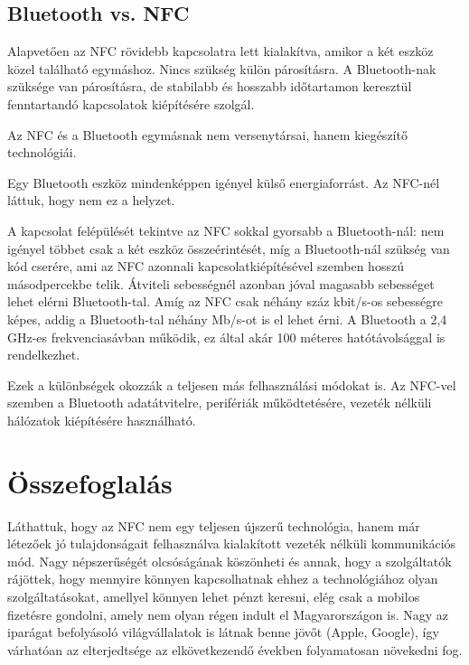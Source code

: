 \documentclass[12pt]{article}
\begin{document}
\subsection{Bluetooth vs. NFC}
Alapvetően az NFC rövidebb kapcsolatra lett kialakítva, amikor a két eszköz közel 
található egymáshoz. Nincs szükség külön párosításra. A Bluetooth-nak szüksége 
van párosításra, de stabilabb és hosszabb időtartamon keresztül fenntartandó
kapcsolatok kiépítésére szolgál.

Az NFC és a Bluetooth egymásnak nem versenytársai, hanem kiegészítő technológiái.

Egy Bluetooth eszköz mindenképpen igényel külső energiaforrást. Az NFC-nél láttuk, 
hogy nem ez a helyzet.

A kapcsolat felépülését tekintve az NFC sokkal gyorsabb a Bluetooth-nál: nem igényel
többet csak a két eszköz összeérintését, míg a Bluetooth-nál szükség van kód
cserére, ami az NFC azonnali kapcsolatkiépítésével szemben hosszú másodpercekbe
telik. Átviteli sebességnél azonban jóval magasabb sebességet lehet elérni
Bluetooth-tal. Amíg az NFC csak néhány száz kbit/s-os sebességre képes, addig
a Bluetooth-tal néhány Mb/s-ot is el lehet érni. A Bluetooth a 2,4 GHz-es 
frekvenciasávban működik, ez által akár 100 méteres hatótávolsággal is 
rendelkezhet.

Ezek a különbségek okozzák a teljesen más felhasználási módokat is. Az NFC-vel 
szemben a Bluetooth adatátvitelre, perifériák működtetésére, vezeték nélküli 
hálózatok kiépítésére használható.

\section{Összefoglalás}
Láthattuk, hogy az NFC nem egy teljesen újszerű technológia, hanem már létezőek jó
tulajdonságait felhasználva kialakított vezeték nélküli kommunikációs mód.
Nagy népszerűségét olcsóságának köszönheti és annak, hogy a szolgáltatók 
rájöttek, hogy mennyire könnyen kapcsolhatnak ehhez a technológiához olyan
szolgáltatásokat, amellyel könnyen lehet pénzt keresni, elég csak a mobilos
fizetésre gondolni, amely nem olyan régen indult el Magyarországon is.
Nagy az iparágat befolyásoló világvállalatok is látnak benne jövőt (Apple, Google),
így várhatóan az elterjedtsége az elkövetkezendő években folyamatosan növekedni fog.
\end{document}
